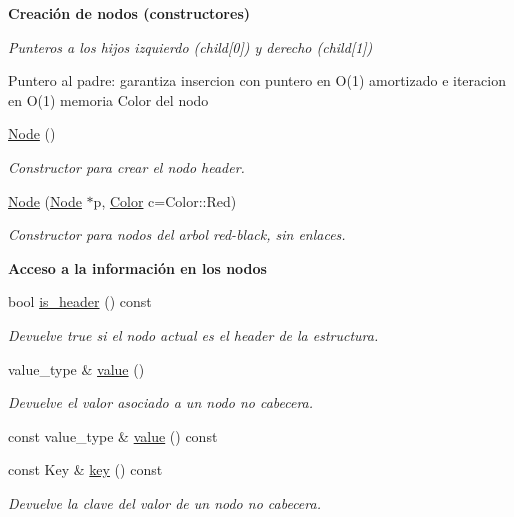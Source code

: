 \begin{Indent}{\bf \-Creación de nodos (constructores)}\par
{\em \-Punteros a los hijos izquierdo (child\mbox{[}0\mbox{]}) y derecho (child\mbox{[}1\mbox{]})

\-Puntero al padre\-: garantiza insercion con puntero en \-O(1) amortizado e iteracion en \-O(1) memoria \-Color del nodo }\begin{DoxyCompactItemize}
\item 
\hyperlink{structaed2_1_1map_1_1Node_a9c1a600491066ce7eb669b1cb76d56c6_a9c1a600491066ce7eb669b1cb76d56c6}{\-Node} ()
\begin{DoxyCompactList}\small\item\em \-Constructor para crear el nodo header. \end{DoxyCompactList}\item 
\hyperlink{structaed2_1_1map_1_1Node_a62b5a42e88e219d53af8237a9ebedb6e_a62b5a42e88e219d53af8237a9ebedb6e}{\-Node} (\hyperlink{structaed2_1_1map_1_1Node}{\-Node} $\ast$p, \hyperlink{classaed2_1_1map_a6d62a415a4b9d320b30cada4ebcf9f5b_a6d62a415a4b9d320b30cada4ebcf9f5b}{\-Color} c=\-Color\-::\-Red)
\begin{DoxyCompactList}\small\item\em \-Constructor para nodos del arbol red-\/black, sin enlaces. \end{DoxyCompactList}\end{DoxyCompactItemize}
\end{Indent}
\begin{Indent}{\bf \-Acceso a la información en los nodos}\par
\begin{DoxyCompactItemize}
\item 
bool \hyperlink{structaed2_1_1map_1_1Node_ae6cc4598a60dbab7120ffae58ebbadca_ae6cc4598a60dbab7120ffae58ebbadca}{is\-\_\-header} () const 
\begin{DoxyCompactList}\small\item\em \-Devuelve true si el nodo actual es el header de la estructura. \end{DoxyCompactList}\item 
value\-\_\-type \& \hyperlink{structaed2_1_1map_1_1Node_af4ada8e79dabb4849fc87de63d3970fb_af4ada8e79dabb4849fc87de63d3970fb}{value} ()
\begin{DoxyCompactList}\small\item\em \-Devuelve el valor asociado a un nodo no cabecera. \end{DoxyCompactList}\item 
const value\-\_\-type \& \hyperlink{structaed2_1_1map_1_1Node_a747a33f40ad748d750372fe73aea0b32_a747a33f40ad748d750372fe73aea0b32}{value} () const 
\item 
const \-Key \& \hyperlink{structaed2_1_1map_1_1Node_a5451f8da0b7ad3582fab1decad5d09cb_a5451f8da0b7ad3582fab1decad5d09cb}{key} () const 
\begin{DoxyCompactList}\small\item\em \-Devuelve la clave del valor de un nodo no cabecera. \end{DoxyCompactList}\end{DoxyCompactItemize}
\end{Indent}


